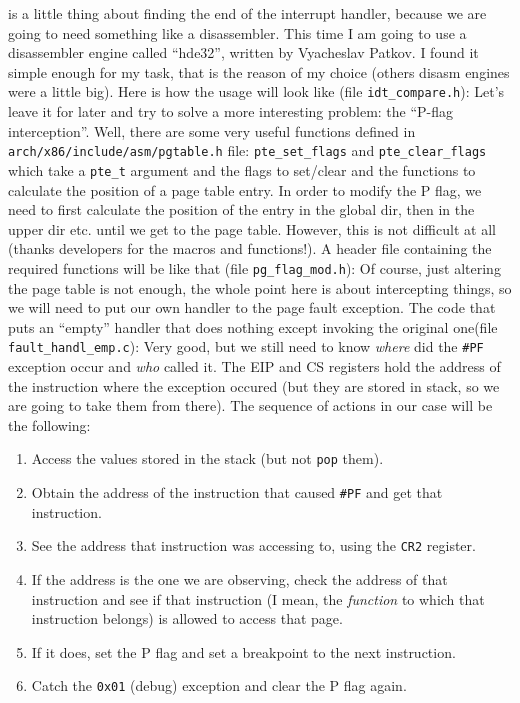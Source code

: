 \documentclass[12pt]{article}
\begin{document}
is a little thing about finding the end of the interrupt handler,
because we are going to need something like a disassembler. This time
I am going to use a disassembler engine called ``hde32'', written by
Vyacheslav Patkov. I found it simple enough for my task, that is the
reason of my choice (others disasm engines were a little big). Here is
how the usage will look like (file \verb!idt_compare.h!):
 Let's leave it for later and try to
solve a more interesting problem: the ``P-flag interception''. Well,
there are some very useful functions defined in
\verb!arch/x86/include/asm/pgtable.h! file: \verb!pte_set_flags! and
\verb!pte_clear_flags! which take a \verb!pte_t! argument and the
flags to set/clear and the functions to calculate the position of a
page table entry. In order to modify the P flag, we need to first
calculate the position of the entry in the global dir, then in the
upper dir etc. until we get to the page table. However, this is not
difficult at all (thanks developers for the macros and functions!). A
header file containing the required functions will be like that (file
\verb!pg_flag_mod.h!):  Of course, just
altering the page table is not enough, the whole point here is about
intercepting things, so we will need to put our own handler to the
page fault exception. The code that puts an ``empty'' handler that
does nothing except invoking the original one(file
\verb!fault_handl_emp.c!):  Very
good, but we still need to know \emph{where} did the \verb!#PF!
exception occur and \emph{who} called it. The EIP and CS registers
hold the address of the instruction where the exception occured (but
they are stored in stack, so we are going to take them from
there). The sequence of actions in our case will be the following:

\begin{enumerate}
  \item Access the values stored in the stack (but not \verb!pop!
    them).
    
  \item Obtain the address of the instruction that caused \verb!#PF!
    and get that instruction.
    
  \item See the address that instruction was accessing to, using
    the \verb!CR2! register.

  \item If the address is the one we are observing, check the address
    of that instruction and see if that instruction (I mean, the
    \emph{function} to which that instruction belongs) is allowed to
    access that page.

  \item If it does, set the P flag and set a breakpoint to the next
    instruction.

  \item Catch the \verb!0x01! (debug) exception and clear the P flag
    again.
\end{enumerate}
\end{document}
